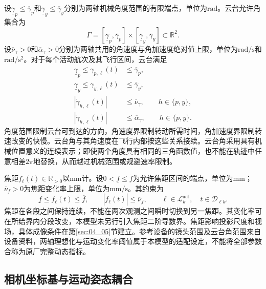 设$\underline\gamma_p\le\overline\gamma_p$和$\underline\gamma_y\le\overline\gamma_y$分别为两轴机械角度范围的有限端点，单位为$\mathrm{rad}$。云台允许角集合为
\begin{equation}
 \Gamma=
 [\underline\gamma_p,\overline\gamma_p]
 \times[\underline\gamma_y,\overline\gamma_y]
 \subset\mathbb R^2.
 \label{s0404:gimbal_domain}
\end{equation}
设$\overline\nu_\gamma>0$和$\overline\alpha_\gamma>0$分别为两轴共用的角速度与角加速度绝对值上限，单位为$\mathrm{rad/s}$和$\mathrm{rad/s^2}$。对于每个活动航次及其飞行区间，云台满足
\begin{subequations}
\label{s0404:gimbal_bounds}
\begin{align}
 \underline\gamma_p\le\gamma_{p,\ell}(t)
 &\le\overline\gamma_p,
 \label{s0404:pitch_range}\\
 \underline\gamma_y\le\gamma_{y,\ell}(t)
 &\le\overline\gamma_y,
 \label{s0404:gimbal_yaw_range}\\
 |\dot\gamma_{h,\ell}(t)|&\le\overline\nu_\gamma,
 \qquad h\in\{p,y\},
 \label{s0404:gimbal_rates}\\
 |\ddot\gamma_{h,\ell}(t)|&\le\overline\alpha_\gamma,
 \qquad h\in\{p,y\}.
 \label{s0404:gimbal_accelerations}
\end{align}
\end{subequations}
角度范围限制云台可到达的方向，角速度界限制转动所需时间，角加速度界限制转速改变的快慢。云台角与其角速度在飞行内部按这些关系接续。云台角采用具有机械位置意义的连续表示；即使两个角度具有相同的三角函数值，也不能在轨迹中任意相差$2\pi$地替换，从而越过机械范围或规避速率限制。

焦距$f_\ell(t)\in\mathbb R_{>0}$以$\mathrm{mm}$计。设$0<\underline f\le\overline f$为允许焦距区间的端点，单位为$\mathrm{mm}$；$\overline\nu_f>0$为焦距变化率上限，单位为$\mathrm{mm/s}$。其约束为
\begin{equation}
 \underline f\le f_\ell(t)\le\overline f,
 \qquad
 |\dot f_\ell(t)|\le\overline\nu_f,
 \qquad \ell\in\mathcal L_k^{\mathrm{act}},\quad t\in\mathcal D_{\ell k}.
 \label{s0404:focal_bounds}
\end{equation}
焦距在各段之间保持连续，不能在两次观测之间瞬时切换到另一焦距。其变化率可在所给界内分段改变，本模型未另行引入焦距二阶导数界。焦距影响投影尺度和视场，具体成像条件在第\ref{sec:04_05}节建立。参考设备的镜头范围及云台角范围来自设备资料\cite{DJIH20}，两轴理想化与运动变化率阈值属于本模型的适配设定，不能将全部参数合称为原厂完整动态指标。

\subsection{相机坐标基与运动姿态耦合}

